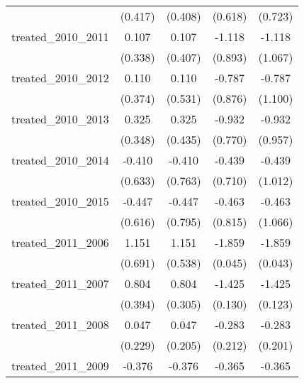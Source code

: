 {\begin{tabular}{l*{4}{c}}
            &     (0.417)         &     (0.408)         &     (0.618)         &     (0.723)         \\
[1em]
treated\_2010\_2011&       0.107         &       0.107         &      -1.118         &      -1.118         \\
            &     (0.338)         &     (0.407)         &     (0.893)         &     (1.067)         \\
[1em]
treated\_2010\_2012&       0.110         &       0.110         &      -0.787         &      -0.787         \\
            &     (0.374)         &     (0.531)         &     (0.876)         &     (1.100)         \\
[1em]
treated\_2010\_2013&       0.325         &       0.325         &      -0.932         &      -0.932         \\
            &     (0.348)         &     (0.435)         &     (0.770)         &     (0.957)         \\
[1em]
treated\_2010\_2014&      -0.410         &      -0.410         &      -0.439         &      -0.439         \\
            &     (0.633)         &     (0.763)         &     (0.710)         &     (1.012)         \\
[1em]
treated\_2010\_2015&      -0.447         &      -0.447         &      -0.463         &      -0.463         \\
            &     (0.616)         &     (0.795)         &     (0.815)         &     (1.066)         \\
[1em]
treated\_2011\_2006&       1.151         &       1.151\sym{*}  &      -1.859\sym{***}&      -1.859\sym{***}\\
            &     (0.691)         &     (0.538)         &     (0.045)         &     (0.043)         \\
[1em]
treated\_2011\_2007&       0.804\sym{*}  &       0.804\sym{**} &      -1.425\sym{***}&      -1.425\sym{***}\\
            &     (0.394)         &     (0.305)         &     (0.130)         &     (0.123)         \\
[1em]
treated\_2011\_2008&       0.047         &       0.047         &      -0.283         &      -0.283         \\
            &     (0.229)         &     (0.205)         &     (0.212)         &     (0.201)         \\
[1em]
treated\_2011\_2009&      -0.376         &      -0.376         &      -0.365         &      -0.365         \\

\end{tabular}}
